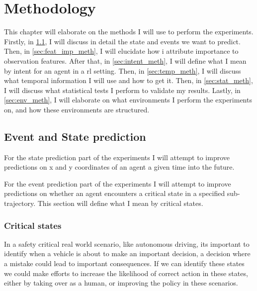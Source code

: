 \documentclass[UKenglish]{uiomasterthesis}
\begin{document}
\chapter{Methodology}
\label{chap:meth}
This chapter will elaborate on the methods I will use to perform the experiments. Firstly, in \cref{sec:event_state_meth}, I will discuss in detail the state and events we want to predict. Then, in \cref{sec:feat_imp_meth}, I will elucidate how i attribute importance to observation features. After that, in \cref{sec:intent_meth}, I will define what I mean by intent for an agent in a \ac{rl} setting. Then, in \cref{sec:temp_meth}, I will discuss what temporal information I will use and how to get it. Then, in \cref{sec:stat_meth}, I will discuss what statistical tests I perform to validate my results. Lastly, in \cref{sec:env_meth}, I will elaborate on what environments I perform the experiments on, and how these environments are structured.


\section{Event and State prediction}
\label{sec:event_state_meth}
For the state prediction part of the experiments I will attempt to improve predictions on x and y coordinates of an agent a given time into the future. 

For the event prediction part of the experiments I will attempt to improve predictions on whether an agent encounters a critical state in a specified sub-trajectory. This section will define what I mean by critical states.

\subsection{Critical states}
In a safety critical real world scenario, like autonomous driving, its important to identify when a vehicle is about to make an important decision, a decision where a mistake could lead to important consequences. If we can identify these states we could make efforts to increase the likelihood of correct action in these states, either by taking over as a human, or improving the policy in these scenarios.
\end{document}
